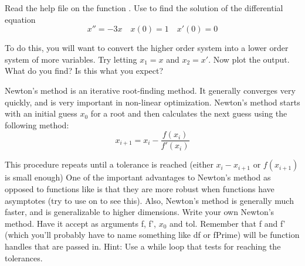 \begin{problem}
Read the help file on the function . Use  to find the solution of the differential equation
\begin{equation*}
        x'' = -3x \quad x(0) = 1 \quad x'(0) = 0
\end{equation*}

To do this, you will want to convert the higher order system into a lower order system of more variables. Try letting $x_1 = x$ and $x_2 = x'$.
Now plot the output. What do you find? Is this what you expect?
\end{problem}

\begin{problem}
Newton's method is an iterative root-finding method. It generally converges very quickly, and is very important in non-linear optimization. Newton's method starts with an initial guess $x_0$ for a root and then calculates the next guess using the following method:
\begin{equation*}
x_{i+1} = x_i - \frac{f(x_i)}{f'(x_i)}
\end{equation*}

This procedure repeats until a tolerance is reached (either $x_i - x_{i+1}$ or $f(x_{i+1})$ is small enough)
One of the important advantages to Newton's method as opposed to functions like  is that they are more robust when functions have asymptotes (try to use  on  to see this). Also, Newton's method is generally much faster, and is generalizable to higher dimensions.
Write your own Newton's method. Have it accept as arguments f, f', $x_0$ and tol. Remember that f and f' (which you'll probably have to name something like df or fPrime) will be function handles that are passed in. Hint: Use a while loop that tests for reaching the tolerances.
\end{problem}
